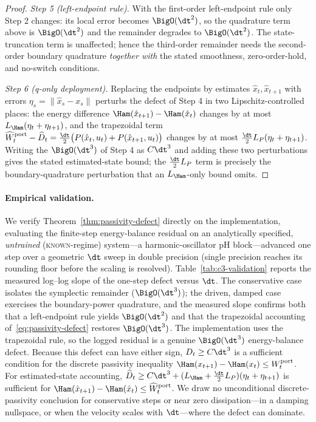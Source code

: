 \begin{proof}
\emph{Step 5 (left-endpoint rule).} With the first-order left-endpoint rule only Step 2 changes: its local error becomes $\BigO(\dt^2)$, so the quadrature term above is $\BigO(\dt^2)$ and the remainder degrades to $\BigO(\dt^2)$. The state-truncation term is unaffected; hence the third-order remainder needs the second-order boundary quadrature \emph{together with} the stated smoothness, zero-order-hold, and no-switch conditions.

\emph{Step 6 (q-only deployment).} Replacing the endpoints by estimates $\hat x_t,\hat x_{t+1}$ with errors $\eta_s=\lVert\hat x_s-x_s\rVert$ perturbs the defect of Step 4 in two Lipschitz-controlled places: the energy difference $\Ham(\hat x_{t+1})-\Ham(\hat x_t)$ changes by at most $L_{\Ham}(\eta_t+\eta_{t+1})$, and the trapezoidal term $\widehat W^{\mathrm{port}}_t-\widehat D_t=\tfrac{\dt}{2}\bigl(P(\hat x_t,u_t)+P(\hat x_{t+1},u_t)\bigr)$ changes by at most $\tfrac{\dt}{2}L_P(\eta_t+\eta_{t+1})$. Writing the $\BigO(\dt^3)$ of Step 4 as $C\dt^3$ and adding these two perturbations gives the stated estimated-state bound; the $\tfrac{\dt}{2}L_P$ term is precisely the boundary-quadrature perturbation that an $L_{\Ham}$-only bound omits.
\end{proof}

\paragraph{Empirical validation.}
We verify Theorem~\ref{thm:passivity-defect} directly on the implementation, evaluating the finite-step energy-balance residual on an analytically specified, \emph{untrained} (\textsc{known}-regime) system---a harmonic-oscillator pH block---advanced one step over a geometric $\dt$ sweep in double precision (single precision reaches its rounding floor before the scaling is resolved). Table~\ref{tab:c3-validation} reports the measured log--log slope of the one-step defect versus $\dt$.
The conservative case isolates the symplectic remainder ($\BigO(\dt^3)$); the driven, damped case exercises the boundary-power quadrature, and the measured slope confirms both that a left-endpoint rule yields $\BigO(\dt^2)$ and that the trapezoidal accounting of~\eqref{eq:passivity-defect} restores $\BigO(\dt^3)$. The implementation uses the trapezoidal rule, so the logged residual is a genuine $\BigO(\dt^3)$ energy-balance defect. Because this defect can have either sign, $D_t\ge C\dt^3$ is a sufficient condition for the discrete passivity inequality $\Ham(x_{t+1})-\Ham(x_t)\le W^{\mathrm{port}}_t$. For estimated-state accounting, $\widehat D_t\ge C\dt^3+(L_{\Ham}+\tfrac{\dt}{2}L_P)(\eta_t+\eta_{t+1})$ is sufficient for $\Ham(\hat x_{t+1})-\Ham(\hat x_t)\le\widehat W^{\mathrm{port}}_t$. We draw no unconditional discrete-passivity conclusion for conservative steps or near zero dissipation---in a damping nullspace, or when the velocity scales with $\dt$---where the defect can dominate.

